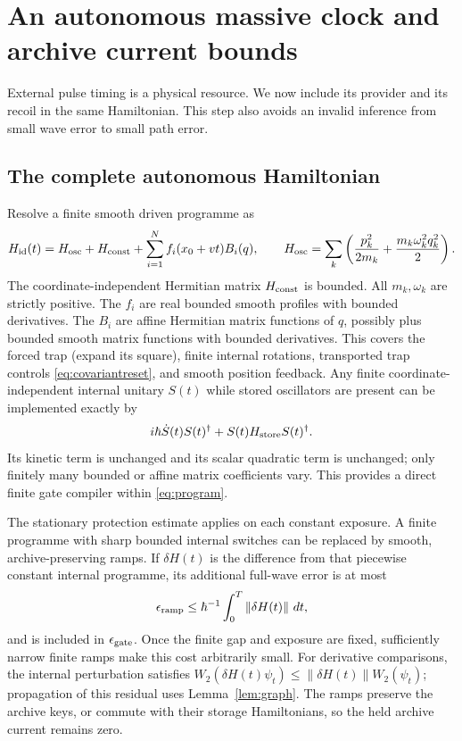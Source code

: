\documentclass[11pt]{article}
\theoremstyle{definition}\newtheorem{assumption}[theorem]{Constitutive assumption}
\theoremstyle{remark}\newtheorem{remark}[theorem]{Remark}
\newcommand{\norm}[1]{\left\|#1\right\|}\newcommand{\pos}[1]{[#1]_+}
\begin{document}
\section{An autonomous massive clock and archive current bounds}
\label{sec:clock}
External pulse timing is a physical resource. We now include its provider and its recoil in the same Hamiltonian. This step also avoids an invalid inference from small wave error to small path error.

\subsection{The complete autonomous Hamiltonian}
Resolve a finite smooth driven programme as
\begin{equation}\label{eq:program}
 H_{\rm id}(t)=H_{\rm osc}+H_{\rm const}+\sum_{i=1}^N f_i(x_0+vt)B_i(q),
 \qquad H_{\rm osc}=\sum_k\left(\frac{p_k^2}{2m_k}
                         +\frac{m_k\omega_k^2q_k^2}{2}\right).
\end{equation}
The coordinate-independent Hermitian matrix $H_{\rm const}$ is bounded. All $m_k,\omega_k$ are strictly positive. The $f_i$ are real bounded smooth profiles with bounded derivatives. The $B_i$ are affine Hermitian matrix functions of $q$, possibly plus bounded smooth matrix functions with bounded derivatives. This covers the forced trap (expand its square), finite internal rotations, transported trap controls \eqref{eq:covariantreset}, and smooth position feedback. Any finite coordinate-independent internal unitary $S(t)$ while stored oscillators are present can be implemented exactly by
\[
 i\hbar\dot S(t)S(t)^\dagger+S(t)H_{\rm store}S(t)^\dagger.
\]
Its kinetic term is unchanged and its scalar quadratic term is unchanged; only finitely many bounded or affine matrix coefficients vary. This provides a direct finite gate compiler within \eqref{eq:program}.

The stationary protection estimate applies on each constant exposure. A finite programme with sharp bounded internal switches can be replaced by smooth, archive-preserving ramps. If $\delta H(t)$ is the difference from that piecewise constant internal programme, its additional full-wave error is at most
\[
 \epsilon_{\rm ramp}\le\hbar^{-1}\int_0^T\norm{\delta H(t)}\,dt,
\]
and is included in $\epsilon_{\rm gate}$. Once the finite gap and exposure are fixed, sufficiently narrow finite ramps make this cost arbitrarily small. For derivative comparisons, the internal perturbation satisfies $W_2(\delta H(t)\psi_t)\le\norm{\delta H(t)}W_2(\psi_t)$; propagation of this residual uses Lemma~\ref{lem:graph}. The ramps preserve the archive keys, or commute with their storage Hamiltonians, so the held archive current remains zero.
\end{document}
